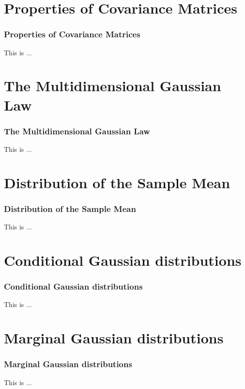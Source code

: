 \documentclass{beamer}
\begin{document}
\section{Properties of Covariance Matrices}
\begin{frame}
\frametitle{Properties of Covariance Matrices}
This is ...
\end{frame}

\section {The Multidimensional Gaussian Law}
\begin{frame}
\frametitle{The Multidimensional Gaussian Law}
This is ...
\end{frame}


 \section{Distribution of the Sample Mean}
\begin{frame}
\frametitle{Distribution of the Sample Mean}
This is ...
\end{frame}

 \section{Conditional Gaussian distributions }
\begin{frame}
\frametitle{Conditional Gaussian distributions}
This is ...
\end{frame}

 \section{Marginal Gaussian distributions }
\begin{frame}
\frametitle{Marginal Gaussian distributions}
This is ...
\end{frame}
\end{document}
